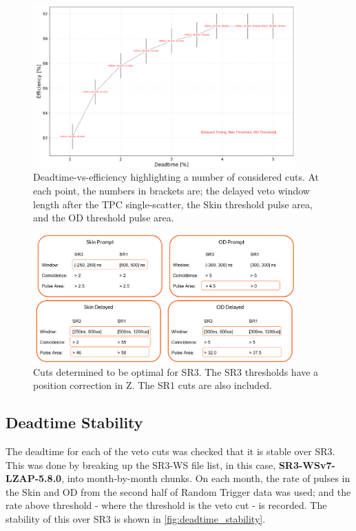 \begin{figure}
    \centering
    \includegraphics[width=0.9\textwidth]{figures/VetoEfficiency/cut_optimisation.png}
    \caption{Deadtime-vs-efficiency highlighting a number of considered cuts.
    At each point, the numbers in brackets are; the delayed veto window length after the TPC single-scatter, the Skin threshold pulse area, and the OD threshold pulse area.}
    \label{fig:veto_cut_optimisation}
\end{figure}

\begin{figure}
    \centering
    \includegraphics[width=0.9\textwidth]{figures/VetoEfficiency/sr3_cuts.png}
    \caption{Cuts determined to be optimal for SR3. 
    The SR3 thresholds have a position correction in Z. The SR1 cuts are also included.}
    \label{fig:sr3_veto_cuts}
\end{figure}

\subsection{Deadtime Stability}

The deadtime for each of the veto cuts was checked that it is stable over SR3.
This was done by breaking up the SR3-WS file list, in this case, \textbf{SR3-WSv7-LZAP-5.8.0}, into month-by-month chunks.
On each month, the rate of pulses in the Skin and OD from the second half of Random Trigger data was used; and the rate above threshold - where the threshold is the veto cut - is recorded. The stability of this over SR3 is shown in \autoref{fig:deadtime_stability}.


